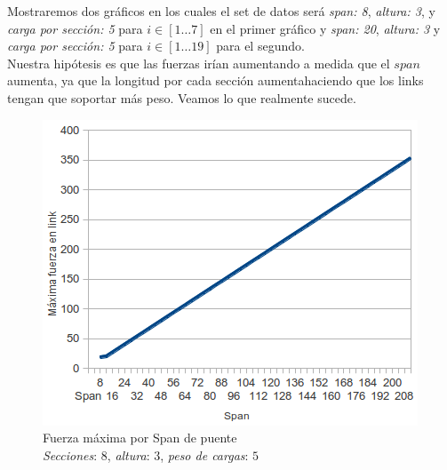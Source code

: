 Mostraremos dos gráficos en los cuales el set de datos será \textit{span: 8},
\textit{altura: 3}, y \textit{carga por sección: 5} para $i \in [1 \dots 7]$ en el primer gráfico y
\textit{span: 20}, \textit{altura: 3} y \textit{carga por sección: 5} para $i \in [1 \dots 19]$ para el segundo.\\

Nuestra hipótesis es que las fuerzas irían aumentando a medida que el $span$
aumenta, ya que la longitud por cada sección aumentahaciendo que los links tengan que soportar más peso. Veamos lo que realmente sucede.\\



\begin{figure}[h!]
	\begin{center}
	\includegraphics[scale=0.8]{archivos/graficos/Fuerza-x-span.png}
	\caption{\label{fig:fuerza_x_span}Fuerza máxima por Span de puente\\  \textit{Secciones}: $8$, \textit{altura}: $3$, \textit{peso de cargas}: $5$}
	\end{center}
\end{figure}

